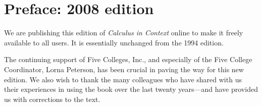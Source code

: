 \chapter*{Preface: 2008 edition}

We are publishing this edition of \emph{Calculus in Context} online to
make it freely available to all users.  It is essentially unchanged
from the 1994 edition.




The continuing support of Five Colleges, Inc., and especially of the
Five College Coordinator, Lorna Peterson, has been crucial in paving
the way for this new edition.  We also wish to thank the many
colleagues who have shared with us their experiences in using the book
over the last twenty years---and have provided us with corrections to
the text.
